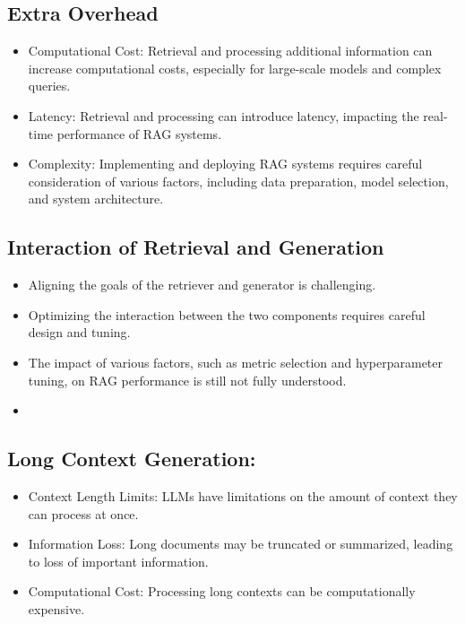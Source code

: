 \subsection{Extra Overhead}
\begin{itemize}
	\item Computational Cost: Retrieval and processing additional information can increase computational costs, especially for large-scale models and complex queries.
	\item Latency: Retrieval and processing can introduce latency, impacting the real-time performance of RAG systems.
	\item Complexity: Implementing and deploying RAG systems requires careful consideration of various factors, including data preparation, model selection, and system architecture.
\end{itemize}
\subsection{Interaction of Retrieval and Generation}
\begin{itemize}
	\item Aligning the goals of the retriever and generator is challenging.
	\item Optimizing the interaction between the two components requires careful design and tuning.
	\item The impact of various factors, such as metric selection and hyperparameter tuning, on RAG performance is still not fully understood.
	\item
	
\end{itemize}
\subsection{Long Context Generation:}

\begin{itemize}
	\item Context Length Limits: LLMs have limitations on the amount of context they can process at once.
	\item Information Loss: Long documents may be truncated or summarized, leading to loss of important information.
	\item Computational Cost: Processing long contexts can be computationally expensive.
\end{itemize}
\newpage

